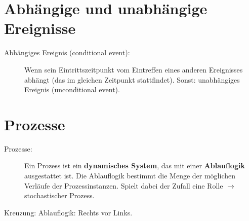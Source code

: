 \documentclass[11pt, a4paper]{article}
\begin{document}
\begin{figure}[H]
\centering
{}
\end{figure}

\section{Abhängige und unabhängige Ereignisse}

\begin{figure}[H]
\centering
{}
\end{figure}

\begin{description}
\item[Abhängiges Ereignis (conditional event):] Wenn  sein Eintrittszeitpunkt vom Eintreffen eines anderen Ereignisses abhängt (das im gleichen Zeitpunkt stattfindet). Sonst: unabhängiges Ereignis (unconditional event).
\end{description}

\section{Prozesse}
\begin{description}
\item[Prozesse:] Ein Prozess ist ein \textbf{dynamisches System}, das mit einer \textbf{Ablauflogik} ausgestattet ist. Die Ablauflogik bestimmt die Menge der möglichen Verläufe der Prozessinstanzen. Spielt dabei der Zufall eine Rolle $\rightarrow$ stochastischer Prozess.
\end{description}

Kreuzung: Ablauflogik: Rechts vor Links.

\begin{figure}[H]
\centering
{}
\end{figure}



\end{document}
